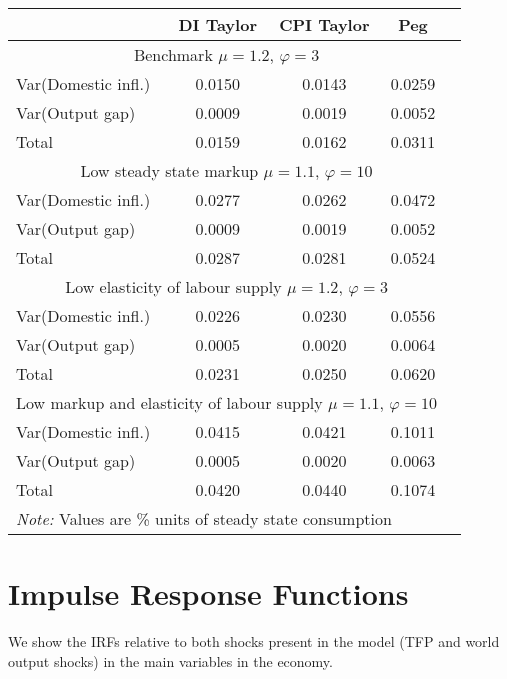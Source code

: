 \documentclass{article}
\begin{document}
\begin{table}[H]
    \centering
    \begin{tabular}{lcccc}
        \hline
        &  DI Taylor & CPI Taylor & Peg\\
        \hline
        \multicolumn{4}{c}{Benchmark $\mu = 1.2$, $\varphi = 3$}\\
        Var(Domestic infl.) & 0.0150 & 0.0143 & 0.0259 \\
        Var(Output gap) & 0.0009 & 0.0019 & 0.0052 \\
        Total & 0.0159 & 0.0162 & 0.0311 \\
        \multicolumn{4}{c}{Low steady state markup $\mu = 1.1$, $\varphi = 10$}\\
        Var(Domestic infl.) & 0.0277 & 0.0262 & 0.0472 \\
        Var(Output gap) & 0.0009 & 0.0019 & 0.0052 \\
        Total & 0.0287 & 0.0281 & 0.0524 \\
        \multicolumn{4}{c}{Low elasticity of labour supply $\mu = 1.2$, $\varphi = 3$}\\
        Var(Domestic infl.) & 0.0226 & 0.0230 & 0.0556 \\
        Var(Output gap) & 0.0005 & 0.0020 & 0.0064 \\
        Total & 0.0231 & 0.0250 & 0.0620 \\
        \multicolumn{4}{c}{Low markup and elasticity of labour supply $\mu = 1.1$, $\varphi = 10$}\\
        Var(Domestic infl.) & 0.0415 & 0.0421 & 0.1011 \\
        Var(Output gap) & 0.0005 & 0.0020 & 0.0063 \\
        Total & 0.0420 & 0.0440 & 0.1074 \\
        \hline
        \multicolumn{4}{l}{\textit{Note: } Values are \% units of steady state consumption}
    \end{tabular}
\end{table}

\section{Impulse Response Functions}
We show the IRFs relative to both shocks present in the model (TFP and world output shocks) in the main variables in the economy.

\begin{figure}[H]
\centering


\end{figure}
\end{document}
